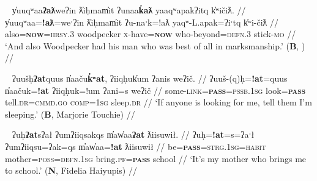 \begin{comment}
\ex \label{ex:doubleatl2}
\begingl
\glpreamble ʔuḥʔaƛ tiic̓̌ap̓aƛ hałmiiḥa. //
\gla ʔuḥ=!aƛ tiic=!ap=!aƛ hałmiiḥa  //
\glb be=\textsc{now} alive.\textsc{dr}=\textsc{caus}=\textsc{now} drown.\textsc{cv} //
\glft `He made him alive from drowning.' (\textbf{C}, \textit{tupaat} Julia Lucas) //
\endgl
\xe
\end{comment}

\ex~ \label{ex:doubleatlyuuqwaa}
\begingl
\glpreamble y̓uuqʷaa\textbf{ʔaƛ}weʔin ƛ̓iḥmam̓it ʔunaa\textbf{k̓aƛ} yaaqʷapakʔitq k̓ʷičiƛ. //
\gla y̓uuqʷaa=\textbf{!aƛ}=weˑʔin ƛ̓iḥmam̓it ʔu-naˑk=!aƛ yaqʷ-L.apak=ʔiˑtq k̓ʷi-čiƛ  //
\glb also=\textbf{\textsc{now}}=\textsc{hrsy.3} woodpecker \textsc{x}-have=\textbf{\textsc{now}} who-beyond=\textsc{defn.3} stick-\textsc{mo} //
\glft `And also Woodpecker had his man who was best of all in marksmanship.' (\textbf{B}, \citealt[50]{sapir1939}) //
\endgl
\xe


\begin{comment}
\ex~ \label{ex:doubleap}
\begingl
\glpreamble hišuk̓ap̓aƛ witkʷaaʔap ʔin wikmaḥsap̓aƛ, ḥaakʷaaƛsma. //
\gla hišuk=!ap=!aƛ witkʷaa=!ap ʔin wik-maḥsa=!ap=!aƛ, ḥaakʷaaƛ-sma  //
\glb all=\textsc{caus}=\textsc{now} destroy=\textsc{caus} \textsc{comp} \textsc{neg}-want.to=\textsc{caus}=\textsc{caus} young.woman-protective.of //
\glft `Everyone destroyed the wharf because they wanted her to marry, they were stingy of the girl.' (\textbf{C}, \textit{tupaat} Julia Lucas) //
\endgl
\xe
\end{comment}


\ex~ \label{ex:doubleatuush}
\begingl
\glpreamble ʔuušḥ\textbf{ʔat}quus n̓aaču\textbf{k̓ʷat}, ʔiiqḥuk̓um ʔanis weʔič. //
\gla ʔuuš-(q)ḥ=\textbf{!at}=quus n̓aačuk=\textbf{!at} ʔiiqḥuk=!um ʔani=s weʔič  //
\glb some-\textsc{link}=\textbf{\textsc{pass}}=\textsc{pssb.1sg} look=\textbf{\textsc{pass}} tell.\textsc{dr}=\textsc{cmmd.go} \textsc{comp}=\textsc{1sg} sleep.\textsc{dr} //
\glft `If anyone is looking for me, tell them I'm sleeping.' (\textbf{B}, Marjorie Touchie) //
\endgl
\xe

\ex~ \label{ex:doubleatuh}
\begingl
\glpreamble ʔuḥ\textbf{ʔat}sʔał ʔumʔiiqsakqs m̓aw̓aa\textbf{ʔat} ƛiisuwił. //
\gla ʔuḥ=\textbf{!at}=s=ʔaˑł ʔumʔiiqsu=ʔak=qs m̓aw̓aa=\textbf{!at} ƛiisuwił  //
\glb be=\textbf{\textsc{pass}}=\textsc{strg.1sg}=\textsc{habit} mother=\textsc{poss}=\textsc{defn.1sg} bring.\textsc{pf}=\textbf{\textsc{pass}} school //
\glft `It's my mother who brings me to school.' (\textbf{N}, Fidelia Haiyupis) //
\endgl
\xe

